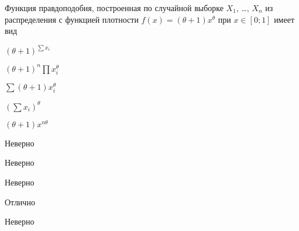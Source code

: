 
\begin{question}
Функция правдоподобия, построенная по случайной выборке \(X_1\), \ldots,
\(X_n\) из распределения с функцией плотности
\(f(x)=(\theta+1)x^{\theta}\) при \(x\in [0;1]\) имеет вид
\begin{answerlist}
  \item \((\theta+1)^{\sum x_i}\)
  \item \((\theta+1)^n\prod x_i^{\theta}\)
  \item \(\sum (\theta+1)x_i^{\theta}\)
  \item \((\sum x_i)^{\theta}\)
  \item \((\theta+1)x^{n\theta}\)
\end{answerlist}
\end{question}

\begin{solution}
\begin{answerlist}
  \item Неверно
  \item Неверно
  \item Неверно
  \item Отлично
  \item Неверно
\end{answerlist}
\end{solution}

